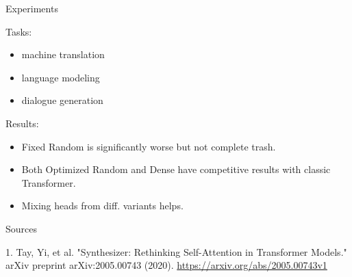 \documentclass{beamer}
\begin{document}
\begin{frame}{Experiments}

Tasks:
\begin{itemize}
\item machine translation
\item language modeling
\item dialogue generation
\end{itemize}

\vfill

Results:
\begin{itemize}
\item Fixed Random is significantly worse but not complete trash.
\item Both Optimized Random and Dense have competitive results with classic Transformer.
\item Mixing heads from diff. variants helps.
\end{itemize}

\end{frame}

\begin{frame}{Sources}
\begin{thebibliography}{0}

   1. Tay, Yi, et al. "Synthesizer: Rethinking Self-Attention in Transformer Models." arXiv preprint arXiv:2005.00743 (2020). \url{https://arxiv.org/abs/2005.00743v1} 
  
\end{thebibliography}

\end{frame}

 
\end{document}

